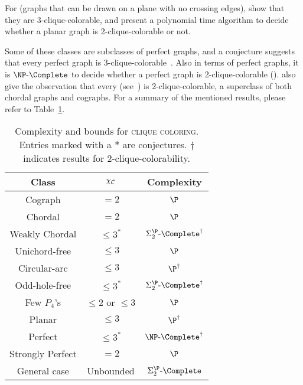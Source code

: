 For  (graphs that can be drawn on a plane with no crossing edges), \citep{clique_coloring_planar} show that they are 3-clique-colorable, and \citep{clique_color_perfect_np_complete} present a polynomial time algorithm to decide whether a planar graph is 2-clique-colorable or not.

Some of these classes are subclasses of perfect graphs, and a conjecture suggests that every perfect graph is 3-clique-colorable~\citep{maximal_clique_coloring}.
Also in terms of perfect graphs, it is $\NPc$ to decide whether a perfect graph is 2-clique-colorable (\cite{clique_color_perfect_np_complete}).
\citep{clique_oddhole} also give the observation that every  (see~\citep{strongly_perfect}) is 2-clique-colorable, a superclass of both chordal graphs and cographs.
For a summary of the mentioned results, please refer to Table~\ref{tab:clique_color_complexity}.

\begin{table}[!htb]
    \centering
    \begin{tabular}{c|c|c}
        \hline
        \hline
        Class            & $\chi_{\mathcal{C}}$             & Complexity \\
        \hline
        Cograph          & $= 2$                & $\P$\\
        Chordal          & $= 2$                & $\P$\\
        Weakly Chordal   & $\leq 3^*$           & $\SiP{2}\text{-}\Complete^\dag$\\
        Unichord-free    & $\leq 3 $            & $\P$ \\
        Circular-arc     & $\leq 3$             & $\P^\dag$ \\
        Odd-hole-free    & $\leq 3^*$           & $\SiP{2}\text{-}\Complete^\dag$\\
        Few $P_4$'s      & $\leq 2$ or $\leq 3$ & $\P$\\
        Planar           & $\leq 3$             & $\P^\dag$\\
        Perfect          & $\leq 3^*$           & $\NPc^\dag$\\ 
        Strongly Perfect & $= 2$                & $\P$\\
        General case     & Unbounded            & $\SiP{2}\text{-}\Complete$\\
        \hline
        \hline
    \end{tabular}
    \caption{Complexity and bounds for \textsc{clique coloring}. Entries marked with a $*$ are conjectures. $\dag$ indicates results for 2-clique-colorability.}
    \label{tab:clique_color_complexity}
\end{table}

